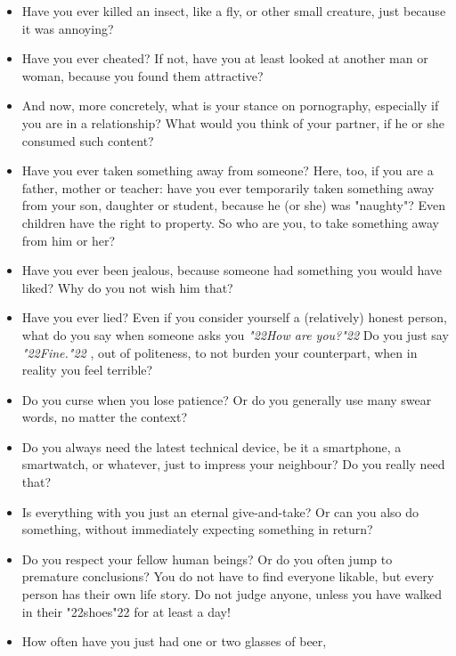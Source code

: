 \documentclass[10pt,a5paper]{article}
\newcommand{\q}[1]{\char"22{#1}\char"22 }
\newcommand{\qq}[1]{\textit{\q{#1}}}
\begin{document}
\begin{itemize}[nosep]
					For example,
					in traffic,
					have you shouted \qq{Idiot} at someone who cut you off?
			\item	Have you ever killed an insect,
					like a fly,
					or other small creature,
					just because it was annoying?
			\item	Have you ever cheated?
					If not,
					have you at least looked at another man or woman,
					because you found them attractive?
			\item	And now,
					more concretely,
					what is your stance on pornography,
					especially if you are in a relationship?
					What would you think of your partner,
					if he or she consumed such content?
			\item	Have you ever taken something away from someone?
					Here,
					too,
					if you are a father,
					mother or teacher:
					have you ever temporarily taken something away from your son,
					daughter or student,
					because he (or she) was "naughty"?
					Even children have the right to property.
					So who are you,
					to take something away from him or her?
			\item	Have you ever been jealous,
					because someone had something you would have liked?
					Why do you not wish him that?
			\item	Have you ever lied?
					Even if you consider yourself a (relatively) honest person,
					what do you say when someone asks you
					\qq{How are you?}
					Do you just say \qq{Fine.},
					out of politeness,
					to not burden your counterpart,
					when in reality you feel terrible?
			\item	Do you curse when you lose patience?
					Or do you generally use many swear words,
					no matter the context?
			\item	Do you always need the latest technical device,
					be it a smartphone,
					a smartwatch,
					or whatever,
					just to impress your neighbour?
					Do you really need that?
			\item	Is everything with you just an eternal give-and-take?
					Or can you also do something,
					without immediately expecting something in return?
			\item	Do you respect your fellow human beings?
					Or do you often jump to premature conclusions?
					You do not have to find everyone likable,
					but every person has their own life story.
					Do not judge anyone,
					unless you have walked in their \q{shoes} for at least a day!
			\item	How often have you just had one or two glasses of beer,

\end{itemize}
\end{document}
